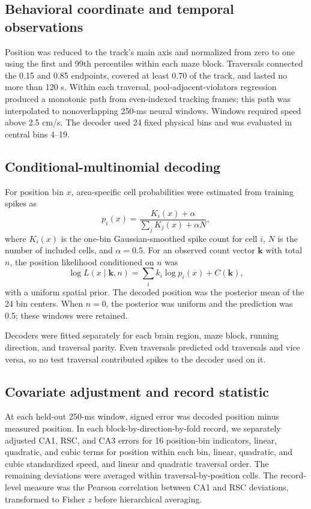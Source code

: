 \documentclass[10pt,twocolumn]{article}
\begin{document}
\subsection{Behavioral coordinate and temporal observations}

Position was reduced to the track's main axis and normalized from zero to one using the first and 99th percentiles within each maze block. Traversals connected the 0.15 and 0.85 endpoints, covered at least 0.70 of the track, and lasted no more than 120 s. Within each traversal, pool-adjacent-violators regression produced a monotonic path from even-indexed tracking frames; this path was interpolated to nonoverlapping 250-ms neural windows. Windows required speed above 2.5 cm/s. The decoder used 24 fixed physical bins and was evaluated in central bins 4--19.

\subsection{Conditional-multinomial decoding}

For position bin $x$, area-specific cell probabilities were estimated from training spikes as
\begin{equation}
p_i(x)=\frac{K_i(x)+\alpha}{\sum_j K_j(x)+\alpha N},
\end{equation}
where $K_i(x)$ is the one-bin Gaussian-smoothed spike count for cell $i$, $N$ is the number of included cells, and $\alpha=0.5$. For an observed count vector $\mathbf{k}$ with total $n$, the position likelihood conditioned on $n$ was
\begin{equation}
\log L(x\mid \mathbf{k},n)=\sum_i k_i\log p_i(x)+C(\mathbf{k}),
\end{equation}
with a uniform spatial prior. The decoded position was the posterior mean of the 24 bin centers. When $n=0$, the posterior was uniform and the prediction was 0.5; these windows were retained.

Decoders were fitted separately for each brain region, maze block, running direction, and traversal parity. Even traversals predicted odd traversals and vice versa, so no test traversal contributed spikes to the decoder used on it.

\subsection{Covariate adjustment and record statistic}

At each held-out 250-ms window, signed error was decoded position minus measured position. In each block-by-direction-by-fold record, we separately adjusted CA1, RSC, and CA3 errors for 16 position-bin indicators, linear, quadratic, and cubic terms for position within each bin, linear, quadratic, and cubic standardized speed, and linear and quadratic traversal order. The remaining deviations were averaged within traversal-by-position cells. The record-level measure was the Pearson correlation between CA1 and RSC deviations, transformed to Fisher $z$ before hierarchical averaging.
\end{document}
